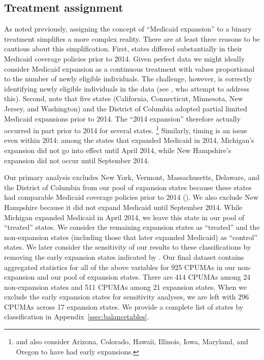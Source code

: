\documentclass[aoas]{imsart}
\theoremstyle{plain}
\theoremstyle{remark}
\begin{document}
\subsection{Treatment assignment} \label{sssec:txassign}

As noted previously, assigning the concept of ``Medicaid expansion'' to a binary treatment simplifies a more complex reality. There are at least three reasons to be cautious about this simplification. First, states differed substantially in their Medicaid coverage policies prior to 2014. Given perfect data we might ideally consider Medicaid expansion as a continuous treatment with values proportional to the number of newly eligible individuals. The challenge, however, is correctly identifying newly eligible individuals in the data (see \cite{frean2017premium}, who attempt to address this). Second, \cite{frean2017premium} note that five states (California, Connecticut, Minnesota, New Jersey, and Washington) and the District of Columbia adopted partial limited Medicaid expansions prior to 2014. The ``2014 expansion'' therefore actually occurred in part prior to 2014 for several states. \footnote{\cite{kaestner2017effects} and \cite{courtemanche2017early} also consider Arizona, Colorado, Hawaii, Illinois, Iowa, Maryland, and Oregon to have had early expansions.} Similarly, timing is an issue even within 2014: among the states that expanded Medicaid in 2014, Michigan's expansion did not go into effect until April 2014, while New Hampshire's expansion did not occur until September 2014.

Our primary analysis excludes New York, Vermont, Massachusetts, Delaware, and the District of Columbia from our pool of expansion states because these states had comparable Medicaid coverage policies prior to 2014 (\cite{kaestner2017effects}). We also exclude New Hampshire because it did not expand Medicaid until September 2014. While Michigan expanded Medicaid in April 2014, we leave this state in our pool of ``treated'' states. We consider the remaining expansion states as ``treated'' and the non-expansion states (including those that later expanded Medicaid) as ``control'' states. We later consider the sensitivity of our results to these classifications by removing the early expansion states indicated by \cite{frean2017premium}. Our final dataset contains aggregated statistics for all of the above variables for 925 CPUMAs in our non-expansion and our pool of expansion states. There are 414 CPUMAs among 24 non-expansion states and 511 CPUMAs among 21 expansion states. When we exclude the early expansion states for sensitivity analyses, we are left with 296 CPUMAs across 17 expansion states. We provide a complete list of states by classification in Appendix~\ref{ssec:balancetables}.
\end{document}
